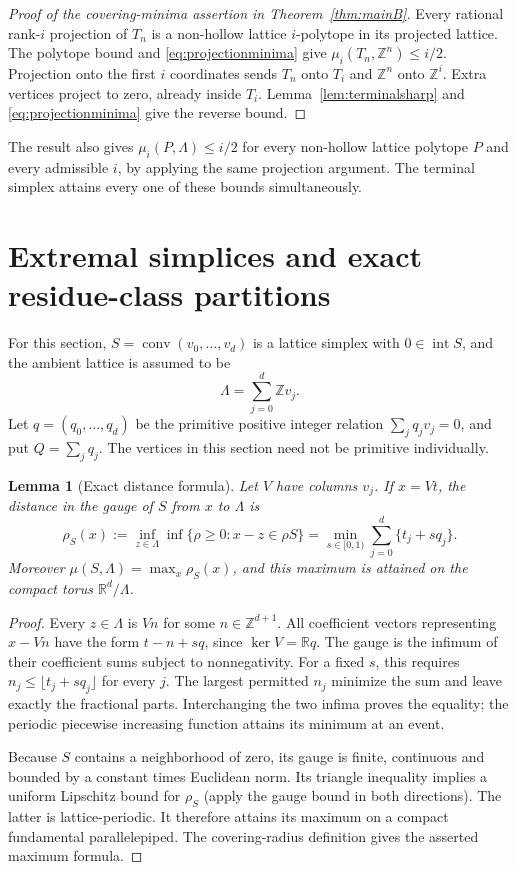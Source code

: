 \documentclass[11pt,a4paper]{article}
\newtheorem{lemma}[theorem]{Lemma}
\theoremstyle{definition}\newtheorem{definition}[theorem]{Definition}
\theoremstyle{remark}\newtheorem{remark}[theorem]{Remark}
\DeclareMathOperator{\conv}{conv}
\DeclareMathOperator{\inter}{int}
\newcommand{\R}{\mathbb R}\newcommand{\Z}{\mathbb Z}
\begin{document}
\begin{proof}[Proof of the covering-minima assertion in Theorem~\ref{thm:mainB}]
Every rational rank-$i$ projection of $T_n$ is a non-hollow lattice
$i$-polytope in its projected lattice. The polytope bound and
\eqref{eq:projectionminima} give $\mu_i(T_n,\Z^n)\le i/2$.
Projection onto the first $i$ coordinates sends $T_n$ onto $T_i$
and $\Z^n$ onto $\Z^i$. Extra vertices project to zero, already
inside $T_i$. Lemma~\ref{lem:terminalsharp} and
\eqref{eq:projectionminima} give the reverse bound.
\end{proof}

The result also gives $\mu_i(P,\Lambda)\le i/2$ for every
non-hollow lattice polytope $P$ and every admissible $i$, by applying
the same projection argument. The terminal simplex attains every
one of these bounds simultaneously.

\section{Extremal simplices and exact residue-class partitions}
\label{sec:ecs}
For this section, $S=\conv(v_0,\ldots,v_d)$ is a lattice simplex
with $0\in\inter S$, and the ambient lattice is assumed to be
\begin{equation}\label{eq:vertexlattice}
 \Lambda=\sum_{j=0}^d\Z v_j.
\end{equation}
Let $q=(q_0,\ldots,q_d)$ be the primitive positive integer relation
$\sum_jq_jv_j=0$, and put $Q=\sum_jq_j$.
The vertices in this section need not be primitive individually.

\begin{lemma}[Exact distance formula]\label{lem:gauge}
Let $V$ have columns $v_j$. If $x=Vt$, the distance in the gauge
of $S$ from $x$ to $\Lambda$ is
\begin{equation}\label{eq:gauge}
 \rho_S(x):=\inf_{z\in\Lambda}\inf\{\rho\ge0:x-z\in\rho S\}
   =\min_{s\in[0,1)}\sum_{j=0}^d\{t_j+sq_j\}.
\end{equation}
Moreover $\mu(S,\Lambda)=\max_x\rho_S(x)$, and this maximum is
attained on the compact torus $\R^d/\Lambda$.
\end{lemma}
\begin{proof}
Every $z\in\Lambda$ is $Vn$ for some $n\in\Z^{d+1}$.
All coefficient vectors representing $x-Vn$ have the form
$t-n+sq$, since $\ker V=\R q$. The gauge is the infimum of their
coefficient sums subject to nonnegativity. For a fixed $s$, this
requires $n_j\le\lfloor t_j+sq_j\rfloor$ for every $j$.
The largest permitted $n_j$ minimize the sum and leave exactly
the fractional parts. Interchanging the two infima proves the
equality; the periodic piecewise increasing function attains its
minimum at an event.

Because $S$ contains a neighborhood of zero, its gauge is finite,
continuous and bounded by a constant times Euclidean norm. Its
triangle inequality implies a uniform Lipschitz bound for
$\rho_S$ (apply the gauge bound in both directions). The latter
is lattice-periodic. It therefore attains its maximum on a compact
fundamental parallelepiped. The covering-radius definition gives
the asserted maximum formula.
\end{proof}
\end{document}

